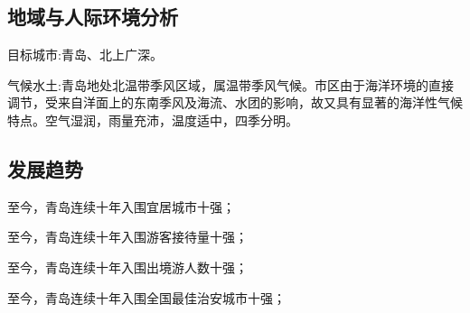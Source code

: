\documentclass{article}
\begin{document}
\subsection{地域与人际环境分析}
目标城市:青岛、北上广深。\par
气候水土:青岛地处北温带季风区域，属温带季风气候。市区由于海洋环境的直接调节，受来自洋面上的东南季风及海流、水团的影响，故又具有显著的海洋性气候特点。空气湿润，雨量充沛，温度适中，四季分明。\par
\subsection{发展趋势}\par
至今，青岛连续十年入围宜居城市十强；

至今，青岛连续十年入围游客接待量十强；

至今，青岛连续十年入围出境游人数十强；

至今，青岛连续十年入围全国最佳治安城市十强；
\end{document}

